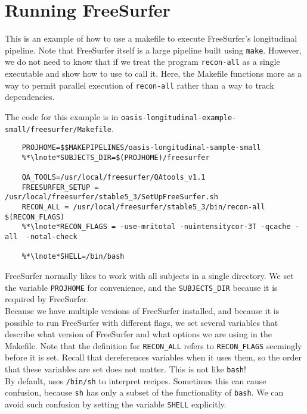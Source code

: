 
\section{Running FreeSurfer}
\def\sectionautorefname{Running Freesurfer}
\label{sec:freesurfer}

This is an example of how to use a makefile to execute FreeSurfer's longitudinal pipeline. Note that FreeSurfer itself is a large pipeline built using \texttt{make}. However, we do not need to know that if we treat the program \texttt{recon-all} as a single executable and show how to use \maken{} to call it. Here, the Makefile functions more as a way to permit parallel execution of \texttt{recon-all} rather than a way to track dependencies. 

The code for this example is in \texttt{oasis-longitudinal-example-small/freesurfer/Makefile}.

\setcounter{codehighlight}{0} %
\begin{lstlisting}
	PROJHOME=$$MAKEPIPELINES/oasis-longitudinal-sample-small
	%*\lnote*SUBJECTS_DIR=$(PROJHOME)/freesurfer

	QA_TOOLS=/usr/local/freesurfer/QAtools_v1.1
	FREESURFER_SETUP = /usr/local/freesurfer/stable5_3/SetUpFreeSurfer.sh
	RECON_ALL = /usr/local/freesurfer/stable5_3/bin/recon-all $(RECON_FLAGS)	
	%*\lnote*RECON_FLAGS = -use-mritotal -nuintensitycor-3T -qcache -all  -notal-check

	%*\lnote*SHELL=/bin/bash
\end{lstlisting}

FreeSurfer normally likes to work with all subjects in a single directory. We set the \maken{} variable \texttt{PROJHOME} for convenience, and the \texttt{SUBJECTS_DIR} because it is required by FreeSurfer. \\
\indent{}Because we have multiple versions of FreeSurfer installed, and because it is possible to run FreeSurfer with different flags, we set several variables that describe what version of FreeSurfer and what options we are using in the Makefile. Note that the definition for \texttt{RECON_ALL} refers to \texttt{RECON_FLAGS} seemingly before it is set. Recall that \maken{} dereferences variables when it uses them, so the order that these variables are set does not matter. This is not like \texttt{bash}!\\
\indent{}By default, \maken{} uses \texttt{/bin/sh} to interpret recipes. Sometimes this can cause confusion, because \texttt{sh} has only a subset of the functionality of \texttt{bash}. We can avoid such confusion by setting the \maken{} variable \texttt{SHELL} explicitly.


